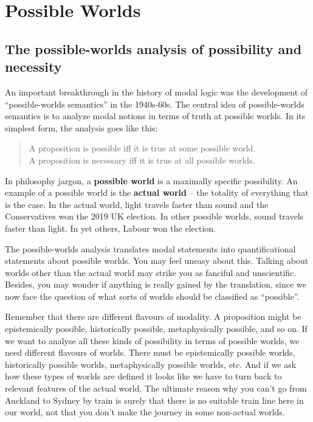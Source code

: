 \chapter{Possible Worlds}\label{ch:worlds}

\section{The possible-worlds analysis of possibility and necessity}

An important breakthrough in the history of modal logic was the development of
``possible-worlds semantics'' in the 1940s-60s.
%
%
The central idea of possible-worlds semantics is to analyze modal notions in
terms of truth at possible worlds. In its simplest form, the analysis goes like
this:
%
\begin{quote}
  A proposition is possible iff it is true at some possible world.\\
  A proposition is necessary iff it is true at all possible worlds.
\end{quote}

In philosophy jargon, a \textbf{possible world} is a maximally specific
possibility. An example of a possible world is the \textbf{actual world} -- the
totality of everything that is the case. In the actual world, light travels
faster than sound and the Conservatives won the 2019 UK election. In other
possible worlds, sound travels faster than light. In yet others, Labour won the
election.

The possible-worlds analysis translates modal statements into quantificational
statements about possible worlds. You may feel uneasy about this. Talking about
worlds other than the actual world may strike you as fanciful and unscientific.
Besides, you may wonder if anything is really gained by the translation, since
we now face the question of what sorts of worlds should be classified as
``possible''.

Remember that there are different flavours of modality. A proposition might be
epistemically possible, historically possible, metaphysically possible, and so
on. If we want to analyse all these kinds of possibility in terms of possible
worlds, we need different flavours of worlds. There must be epistemically
possible worlds, historically possible worlds, metaphysically possible worlds,
etc. And if we ask how these types of worlds are defined it looks like we have
to turn back to relevant features of the actual world. The ultimate reason why
you can't go from Auckland to Sydney by train is surely that there is no
suitable train line here in our world, not that you don't make the journey in
some non-actual worlds.

